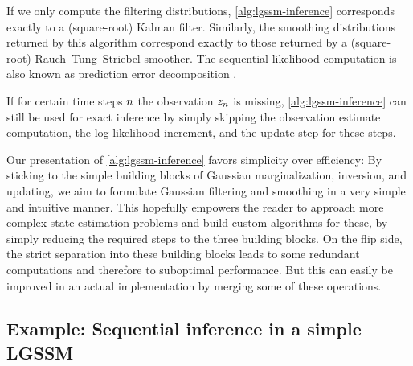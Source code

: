 \documentclass{mimosis}
\begin{document}
If we only compute the filtering distributions, \cref{alg:lgssm-inference} corresponds exactly to a (square-root) Kalman filter.
Similarly, the smoothing distributions returned by this algorithm correspond exactly to those returned by a (square-root) Rauch--Tung--Striebel smoother.
The sequential likelihood computation is also known as prediction error decomposition
\parencite{schweppe1965evaluation}.

\begin{remark}
If for certain time steps \(n\) the observation \(z_n\) is missing, \cref{alg:lgssm-inference} can still be used for exact inference by simply skipping the observation estimate computation, the log-likelihood increment, and the update step for these steps.
\end{remark}

\begin{remark}
Our presentation of \cref{alg:lgssm-inference} favors simplicity over efficiency:
By sticking to the simple building blocks of Gaussian marginalization, inversion, and updating,
we aim to formulate Gaussian filtering and smoothing in a very simple and intuitive manner.
This hopefully empowers the reader to approach more complex state-estimation problems and build custom algorithms for these, by simply reducing the required steps to the three building blocks.
On the flip side, the strict separation into these building blocks leads to some redundant computations and therefore to suboptimal performance.
But this can easily be improved in an actual implementation by merging some of these operations.
\end{remark}
\subsection{Example: Sequential inference in a simple LGSSM}
\label{sec:org9c5fe89}
\label{example:lgssm-inference}
\end{document}
